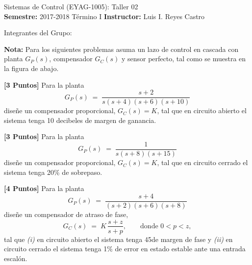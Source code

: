 \documentclass[ a4paper, twoside, 11pt]{article}
\newcommand{\numero}{02}
\begin{document}
\allowdisplaybreaks

\begin{center}
\Large Sistemas de Control (EYAG-1005): Taller \numero \\[1ex]
\small \textbf{Semestre:} 2017-2018 T\'ermino I \qquad
\textbf{Instructor:} Luis I. Reyes Castro
\end{center}
\halfskip

Integrantes del Grupo:
\fullskip
\fullskip
\fullskip

\textbf{Nota:} Para los siguientes problemas asuma un lazo de control en cascada con planta $G_P(s)$, compensador $G_C(s)$ y sensor perfecto, tal como se muestra en la figura de abajo. 

\begin{figure}[htb]
\centering
\def\svgwidth{0.8\columnwidth}

\end{figure}
\fullskip

\begin{problem}
\textbf{[3 Puntos]} Para la planta 
\[
G_P(s) \; = \; 
\frac{s+2}{s(s+4)(s+6)(s+10)}
\]
dise\~ne un compensador proporcional, \ie $G_C(s) = K$, tal que en circuito abierto el sistema tenga 10 decibeles de margen de ganancia. 

\end{problem}
\fullskip

\begin{problem}
\textbf{[3 Puntos]} Para la planta 
\[
G_P(s) \; = \; 
\frac{1}{s(s+8)(s+15)}
\]
dise\~ne un compensador proporcional, \ie $G_C(s) = K$, tal que en circuito cerrado el sistema tenga 20\% de sobrepaso. 

\end{problem}
\fullskip

\begin{problem}
\textbf{[4 Puntos]} Para la planta 
\[
G_P(s) \; = \; 
\frac{s+4}{(s+2)(s+6)(s+8)}
\]
dise\~ne un compensador de atraso de fase, \ie
\[
G_C(s) \; = \; K \, \frac{s+z}{s+p}, 
\qquad \text{donde } 0 < p < z,
\]
tal que \emph{(i)} en circuito abierto el sistema tenga 45\deg de margen de fase y \emph{(ii)} en circuito cerrado el sistema tenga 1\% de error en estado estable ante una entrada escal\'on. 

\end{problem}
\fullskip
\end{document}
